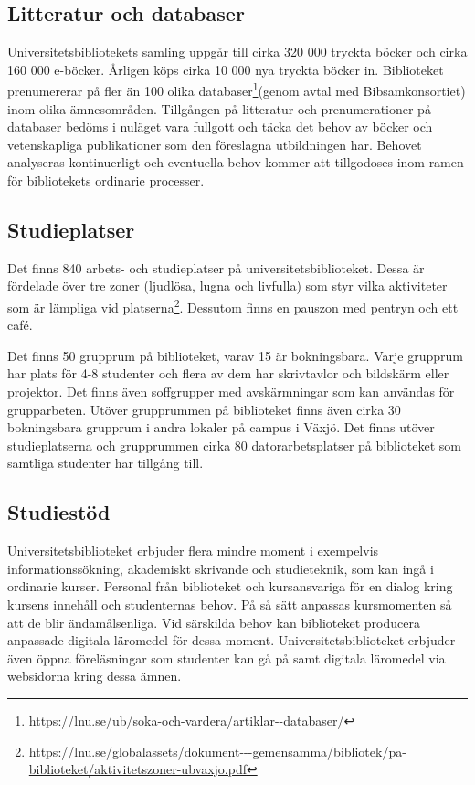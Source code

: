 \subsection{Litteratur och databaser}

Universitetsbibliotekets samling uppgår till cirka 320 000 tryckta böcker och cirka 160 000 e-böcker. Årligen köps cirka 10 000 nya tryckta böcker in. Biblioteket prenumererar på fler än 100 olika databaser\footnote{\url{https://lnu.se/ub/soka-och-vardera/artiklar--databaser/}}(genom avtal med Bibsamkonsortiet) inom olika ämnesområden. Tillgången på litteratur och prenumerationer på databaser bedöms i nuläget vara fullgott och täcka det behov av böcker och vetenskapliga publikationer som den föreslagna utbildningen har. Behovet analyseras kontinuerligt och eventuella behov kommer att tillgodoses inom ramen för bibliotekets ordinarie processer.

\subsection{Studieplatser}

Det finns 840 arbets- och studieplatser på universitetsbiblioteket. Dessa är fördelade över tre zoner (ljudlösa, lugna och livfulla) som styr vilka aktiviteter som är lämpliga vid platserna\footnote{\url{https://lnu.se/globalassets/dokument---gemensamma/bibliotek/pa-biblioteket/aktivitetszoner-ubvaxjo.pdf}}. Dessutom finns en pauszon med pentryn och ett café.

Det finns 50 grupprum på biblioteket, varav 15 är bokningsbara. Varje grupprum har plats för 4-8 studenter och flera av dem har skrivtavlor och bildskärm eller projektor. Det finns även soffgrupper med avskärmningar som kan användas för grupparbeten. Utöver grupprummen på biblioteket finns även cirka 30 bokningsbara grupprum i andra lokaler på campus i Växjö. Det finns utöver studieplatserna och grupprummen cirka 80 datorarbetsplatser på biblioteket som samtliga studenter har tillgång till.

\subsection{Studiestöd}

Universitetsbiblioteket erbjuder flera mindre moment i exempelvis informationssökning, akademiskt skrivande och studieteknik, som kan ingå i ordinarie kurser. Personal från biblioteket och kursansvariga för en dialog kring kursens innehåll och studenternas behov. På så sätt anpassas kursmomenten så att de blir ändamålsenliga. Vid särskilda behov kan biblioteket producera anpassade digitala läromedel för dessa moment. Universitetsbiblioteket erbjuder även öppna föreläsningar som studenter kan gå på samt digitala läromedel via websidorna kring dessa ämnen.

